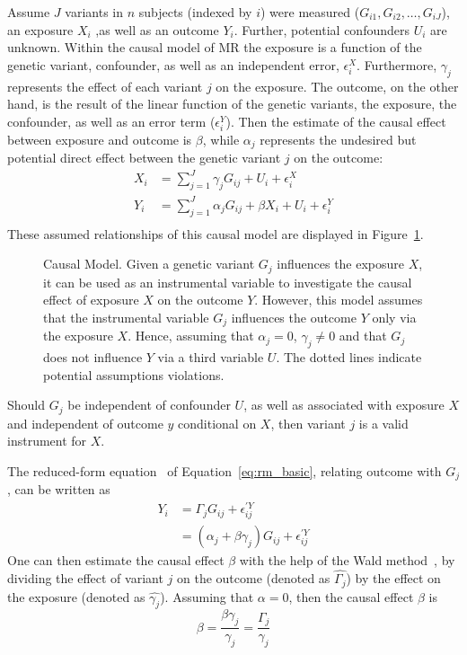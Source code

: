 Assume $J$ variants in $n$ subjects (indexed by $i$) were measured ($G_{i1}, G_{i2}, \ldots , G_{iJ}$),
an exposure $X_i$ ,as well as an outcome $Y_i$.
Further, potential confounders $U_i$ are unknown. 
Within the causal model of MR the exposure is a function of the genetic variant, confounder, as well as an independent error, $\epsilon_i^X$. 
Furthermore, $\gamma_j$ represents the effect of each variant $j$ on the exposure.
The outcome, on the other hand, is the result of the linear function of the genetic variants, the exposure, the confounder, as well as an error term ($\epsilon_i^Y$).
Then the estimate of the causal effect between exposure and outcome is $\beta$, while $\alpha_j$ represents the undesired but potential direct effect between the genetic variant $j$ on the outcome:
\begin{equation} \label{eq:rm_basic}
  \begin{split}
    X_i &= \sum^J_{j=1} \gamma_jG_{ij} + U_i + \epsilon_i^X \\
    Y_i &= \sum^J_{j=1} \alpha_jG_{ij} + \beta X_i + U_i + \epsilon_i^Y \\
  \end{split}
\end{equation}
These assumed relationships of this causal model are displayed in Figure~\ref{fig:causal}.
\begin{figure}[!h]
  \centering
  \resizebox{0.5\textwidth}{!}{}
  \caption[Causal Model]{Causal Model.
    Given a genetic variant $G_j$ influences the exposure $X$, it can be used as an instrumental variable to investigate the causal effect of exposure $X$ on the outcome $Y$.
    However, this model assumes that the instrumental variable $G_j$ influences the outcome $Y$ only via the exposure $X$.
    Hence, assuming that $\alpha_j=0$, $\gamma_j\neq0$ and that $G_j$ does not influence $Y$ via a third variable $U$. 
    The dotted lines indicate potential assumptions violations.
  }\label{fig:causal}
\end{figure}
Should $G_j$ be independent of confounder $U$,
as well as associated with exposure $X$ and independent of outcome $y$ conditional on $X$, then variant $j$ is a valid instrument for $X$.

The reduced-form equation~\cite{Bowden2015} of Equation~\ref{eq:rm_basic}, relating outcome with $G_j$, can be written as
\begin{equation}
	\begin{split}
		Y_i &= \Gamma_j G_{ij} + \epsilon_{ij}^{'Y} \\
		&= (\alpha_j + \beta\gamma_j)G_{ij} + \epsilon_{ij}^{'Y}
	\end{split}
\end{equation}
One can then estimate the causal effect $\beta$ with the help of the Wald method~\cite{Wald1940},
by dividing the effect of variant $j$ on the outcome (denoted as $\hat{\Gamma_j}$) by the effect on the exposure (denoted as $\hat{\gamma_j}$).
Assuming that $\alpha=0$, then the causal effect $\beta$ is
\begin{equation} \label{eq:causal_estiamte}
	\beta = \frac{\beta\gamma_j}{\gamma_j}= \frac{\Gamma_j}{\gamma_j}
\end{equation}

